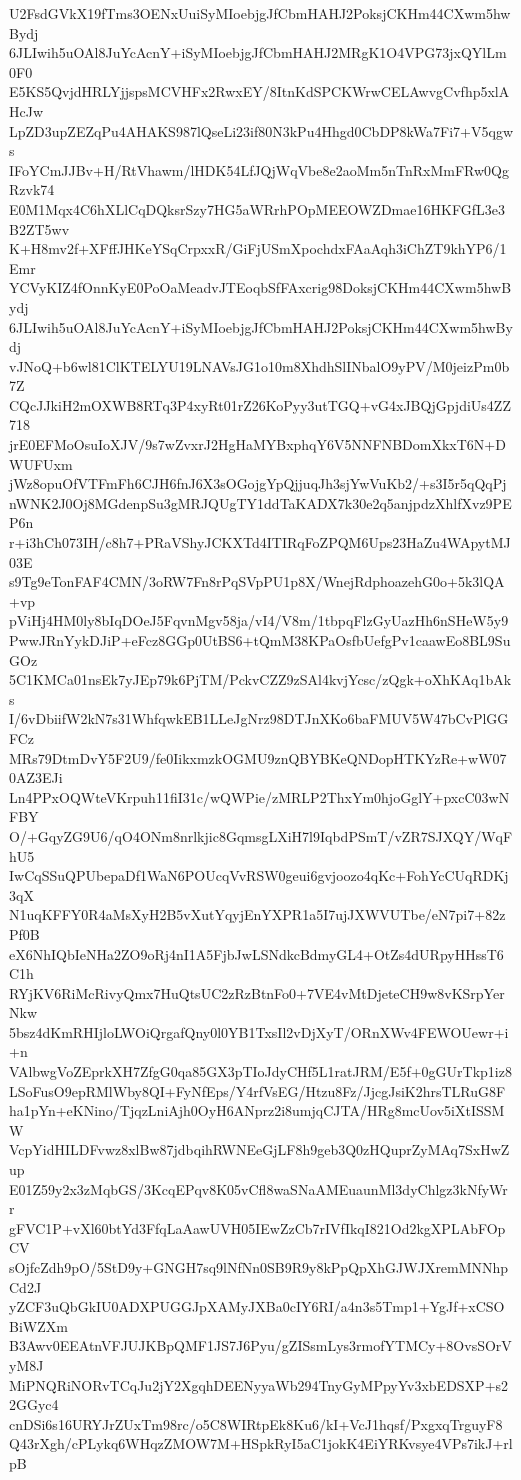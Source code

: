 U2FsdGVkX19fTms3OENxUuiSyMIoebjgJfCbmHAHJ2PoksjCKHm44CXwm5hwBydj
6JLIwih5uOAl8JuYcAcnY+iSyMIoebjgJfCbmHAHJ2MRgK1O4VPG73jxQYlLm0F0
E5KS5QvjdHRLYjjspsMCVHFx2RwxEY/8ItnKdSPCKWrwCELAwvgCvfhp5xlAHcJw
LpZD3upZEZqPu4AHAKS987lQseLi23if80N3kPu4Hhgd0CbDP8kWa7Fi7+V5qgws
IFoYCmJJBv+H/RtVhawm/lHDK54LfJQjWqVbe8e2aoMm5nTnRxMmFRw0QgRzvk74
E0M1Mqx4C6hXLlCqDQksrSzy7HG5aWRrhPOpMEEOWZDmae16HKFGfL3e3B2ZT5wv
K+H8mv2f+XFffJHKeYSqCrpxxR/GiFjUSmXpochdxFAaAqh3iChZT9khYP6/1Emr
YCVyKIZ4fOnnKyE0PoOaMeadvJTEoqbSfFAxcrig98DoksjCKHm44CXwm5hwBydj
6JLIwih5uOAl8JuYcAcnY+iSyMIoebjgJfCbmHAHJ2PoksjCKHm44CXwm5hwBydj
vJNoQ+b6wl81ClKTELYU19LNAVsJG1o10m8XhdhSlINbalO9yPV/M0jeizPm0b7Z
CQcJJkiH2mOXWB8RTq3P4xyRt01rZ26KoPyy3utTGQ+vG4xJBQjGpjdiUs4ZZ718
jrE0EFMoOsuIoXJV/9s7wZvxrJ2HgHaMYBxphqY6V5NNFNBDomXkxT6N+DWUFUxm
jWz8opuOfVTFmFh6CJH6fnJ6X3sOGojgYpQjjuqJh3sjYwVuKb2/+s3I5r5qQqPj
nWNK2J0Oj8MGdenpSu3gMRJQUgTY1ddTaKADX7k30e2q5anjpdzXhlfXvz9PEP6n
r+i3hCh073IH/c8h7+PRaVShyJCKXTd4ITIRqFoZPQM6Ups23HaZu4WApytMJ03E
s9Tg9eTonFAF4CMN/3oRW7Fn8rPqSVpPU1p8X/WnejRdphoazehG0o+5k3lQA+vp
pViHj4HM0ly8bIqDOeJ5FqvnMgv58ja/vI4/V8m/1tbpqFlzGyUazHh6nSHeW5y9
PwwJRnYykDJiP+eFcz8GGp0UtBS6+tQmM38KPaOsfbUefgPv1caawEo8BL9SuGOz
5C1KMCa01nsEk7yJEp79k6PjTM/PckvCZZ9zSAl4kvjYcsc/zQgk+oXhKAq1bAks
I/6vDbiifW2kN7s31WhfqwkEB1LLeJgNrz98DTJnXKo6baFMUV5W47bCvPlGGFCz
MRs79DtmDvY5F2U9/fe0IikxmzkOGMU9znQBYBKeQNDopHTKYzRe+wW070AZ3EJi
Ln4PPxOQWteVKrpuh11fiI31c/wQWPie/zMRLP2ThxYm0hjoGglY+pxcC03wNFBY
O/+GqyZG9U6/qO4ONm8nrlkjic8GqmsgLXiH7l9IqbdPSmT/vZR7SJXQY/WqFhU5
IwCqSSuQPUbepaDf1WaN6POUcqVvRSW0geui6gvjoozo4qKc+FohYcCUqRDKj3qX
N1uqKFFY0R4aMsXyH2B5vXutYqyjEnYXPR1a5I7ujJXWVUTbe/eN7pi7+82zPf0B
eX6NhIQbIeNHa2ZO9oRj4nI1A5FjbJwLSNdkcBdmyGL4+OtZs4dURpyHHssT6C1h
RYjKV6RiMcRivyQmx7HuQtsUC2zRzBtnFo0+7VE4vMtDjeteCH9w8vKSrpYerNkw
5bsz4dKmRHIjloLWOiQrgafQny0l0YB1TxsIl2vDjXyT/ORnXWv4FEWOUewr+i+n
VAlbwgVoZEprkXH7ZfgG0qa85GX3pTIoJdyCHf5L1ratJRM/E5f+0gGUrTkp1iz8
LSoFusO9epRMlWby8QI+FyNfEps/Y4rfVsEG/Htzu8Fz/JjcgJsiK2hrsTLRuG8F
ha1pYn+eKNino/TjqzLniAjh0OyH6ANprz2i8umjqCJTA/HRg8mcUov5iXtISSMW
VcpYidHILDFvwz8xlBw87jdbqihRWNEeGjLF8h9geb3Q0zHQuprZyMAq7SxHwZup
E01Z59y2x3zMqbGS/3KcqEPqv8K05vCfl8waSNaAMEuaunMl3dyChlgz3kNfyWrr
gFVC1P+vXl60btYd3FfqLaAawUVH05IEwZzCb7rIVfIkqI821Od2kgXPLAbFOpCV
sOjfcZdh9pO/5StD9y+GNGH7sq9lNfNn0SB9R9y8kPpQpXhGJWJXremMNNhpCd2J
yZCF3uQbGkIU0ADXPUGGJpXAMyJXBa0cIY6RI/a4n3s5Tmp1+YgJf+xCSOBiWZXm
B3Awv0EEAtnVFJUJKBpQMF1JS7J6Pyu/gZISsmLys3rmofYTMCy+8OvsSOrVyM8J
MiPNQRiNORvTCqJu2jY2XgqhDEENyyaWb294TnyGyMPpyYv3xbEDSXP+s22GGyc4
cnDSi6s16URYJrZUxTm98rc/o5C8WIRtpEk8Ku6/kI+VcJ1hqsf/PxgxqTrguyF8
Q43rXgh/cPLykq6WHqzZMOW7M+HSpkRyI5aC1jokK4EiYRKvsye4VPs7ikJ+rlpB
